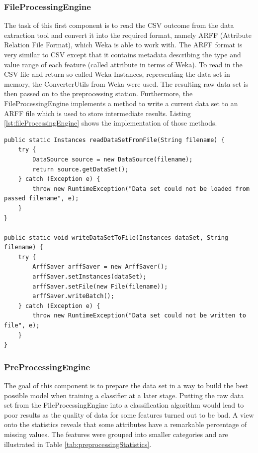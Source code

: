 \subsubsection{FileProcessingEngine}
The task of this first component is to read the CSV outcome from the data extraction tool and convert it into the required format, namely ARFF (Attribute Relation File Format), which Weka is able to work with. The ARFF format is very similar to CSV except that it contains metadata describing the type and value range of each feature (called attribute in terms of Weka). To read in the CSV file and return so called Weka Instances, representing the data set in-memory, the ConverterUtils from Weka were used. The resulting raw data set is then passed on to the preprocessing station. Furthermore, the FileProcessingEngine implements a method to write a current data set to an ARFF file which is used to store intermediate results. Listing \ref{lst:fileProcessingEngine} shows the implementation of those methods. 
\pagebreak
\begin{lstlisting}[caption={Implementation of FileProessingEngine}, label={lst:fileProcessingEngine}]
public static Instances readDataSetFromFile(String filename) {
	try {
		DataSource source = new DataSource(filename);
		return source.getDataSet();
	} catch (Exception e) {
		throw new RuntimeException("Data set could not be loaded from passed filename", e);
	}
}

public static void writeDataSetToFile(Instances dataSet, String filename) {
	try {
		ArffSaver arffSaver = new ArffSaver();
		arffSaver.setInstances(dataSet);
		arffSaver.setFile(new File(filename));
		arffSaver.writeBatch();
	} catch (Exception e) {
		throw new RuntimeException("Data set could not be written to file", e);
	}
}
\end{lstlisting}

\subsubsection{PreProcessingEngine}
The goal of this component is to prepare the data set in a way to build the best possible model when training a classifier at a later stage. Putting the raw data set from the FileProcessingEngine into a classification algorithm would lead to poor results as the quality of data for some features turned out to be bad. A view onto the statistics reveals that some attributes have a remarkable percentage of missing values. The features were grouped into smaller categories and are illustrated in Table \ref{tab:preprocessingStatistics}.

